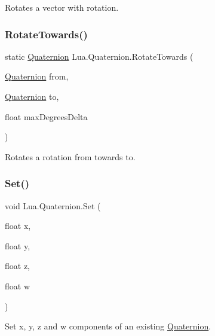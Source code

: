 Rotates a vector with rotation. 

\mbox{\label{class_lua_1_1_quaternion_abfa084dd85c43e01da75d9bcf3305871}} 
\subsubsection{\texorpdfstring{RotateTowards()}{RotateTowards()}}
{\footnotesize\ttfamily static \mbox{\hyperlink{class_lua_1_1_quaternion}{Quaternion}} Lua.\+Quaternion.\+Rotate\+Towards (\begin{DoxyParamCaption}\item[{\mbox{\hyperlink{class_lua_1_1_quaternion}{Quaternion}}}]{from,  }\item[{\mbox{\hyperlink{class_lua_1_1_quaternion}{Quaternion}}}]{to,  }\item[{float}]{max\+Degrees\+Delta }\end{DoxyParamCaption})\hspace{0.3cm}{\ttfamily [static]}}



Rotates a rotation from towards to. 

\mbox{\label{class_lua_1_1_quaternion_a0cb037e26892fa50a048fc751f7f017a}} 
\subsubsection{\texorpdfstring{Set()}{Set()}}
{\footnotesize\ttfamily void Lua.\+Quaternion.\+Set (\begin{DoxyParamCaption}\item[{float}]{x,  }\item[{float}]{y,  }\item[{float}]{z,  }\item[{float}]{w }\end{DoxyParamCaption})}



Set x, y, z and w components of an existing \mbox{\hyperlink{class_lua_1_1_quaternion}{Quaternion}}. 

\mbox{\label{class_lua_1_1_quaternion_aa7991983472a41d5d7c1b7cb61eb5580}} 
